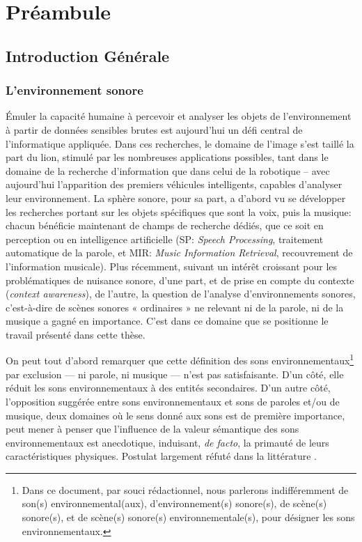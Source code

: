 \chapter{Préambule}\label{ch:pream_intro}


\section{Introduction Générale}

\subsection{L'environnement sonore}

Émuler la capacité humaine à percevoir et analyser les objets de l'environnement à partir de données sensibles brutes est aujourd'hui un défi central de l'informatique appliquée. Dans ces recherches, le domaine de l'image s'est taillé la part du lion, stimulé par les nombreuses applications possibles, tant dans le domaine de la recherche d'information que dans celui de la robotique -- avec aujourd'hui l'apparition des premiers véhicules intelligents, capables d'analyser leur environnement. La sphère sonore, pour sa part, a d'abord vu se développer les recherches portant sur les objets spécifiques que sont la voix, puis la musique: chacun bénéficie maintenant de champs de recherche dédiés, que ce soit en perception ou en intelligence artificielle (SP: \emph{Speech Processing}, traitement automatique de la parole, et MIR: \emph{Music Information Retrieval}, recouvrement de l'information musicale). Plus récemment, suivant un intérêt croissant pour les problématiques de nuisance sonore, d'une part, et de prise en compte du contexte (\emph{context awareness}), de l'autre, la question de l'analyse d'environnements sonores, c'est-à-dire de scènes sonores « ordinaires » ne relevant ni de la parole, ni de la musique a gagné en importance. C'est dans ce domaine que se positionne le travail présenté dans cette thèse.

On peut tout d'abord remarquer que cette définition des sons environnementaux\footnote{Dans ce document, par souci rédactionnel, nous parlerons indifféremment de son(s) environnemental(aux), d'environnement(s) sonore(s), de scène(s) sonore(s), et de scène(s) sonore(s) environnementale(s), pour désigner les sons environnementaux.} par exclusion --- ni parole, ni musique --- n'est pas satisfaisante. D'un côté, elle réduit les sons environnementaux à des entités secondaires. D'un autre côté, l'opposition suggérée entre sons environnementaux et sons de paroles et/ou de musique, deux domaines où le sens donné aux sons est de première importance, peut mener à penser que l'influence de la valeur sémantique des sons environnementaux est anecdotique, induisant, \emph{de facto}, la primauté de leurs caractéristiques physiques. Postulat largement réfuté dans la littérature \citep{ballas1987interpreting}.

